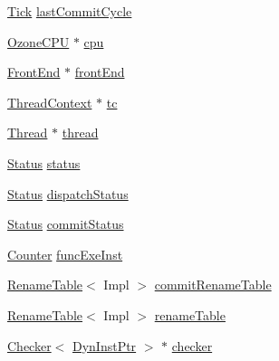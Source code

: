 \begin{DoxyCompactItemize}
\item 
\hyperlink{base_2types_8hh_a5c8ed81b7d238c9083e1037ba6d61643}{Tick} \hyperlink{classLWBackEnd_aeb527b92e111b469a5358de46cc799b6}{lastCommitCycle}
\item 
\hyperlink{classOzoneCPU}{OzoneCPU} $\ast$ \hyperlink{classLWBackEnd_a61b5f503eec141308b0cd6b4322b405b}{cpu}
\item 
\hyperlink{classFrontEnd}{FrontEnd} $\ast$ \hyperlink{classLWBackEnd_a67c762418bb2017cb2dce5a0c94f0788}{frontEnd}
\item 
\hyperlink{classThreadContext}{ThreadContext} $\ast$ \hyperlink{classLWBackEnd_a4455a4759e69e5ebe68ae7298cbcc37d}{tc}
\item 
\hyperlink{structOzoneThreadState}{Thread} $\ast$ \hyperlink{classLWBackEnd_a743989b66f3b52f1eda2a8498a93da0b}{thread}
\item 
\hyperlink{classLWBackEnd_a67a0db04d321a74b7e7fcfd3f1a3f70b}{Status} \hyperlink{classLWBackEnd_ae29aa2d4ae440022daaed1107eb306b3}{status}
\item 
\hyperlink{classLWBackEnd_a67a0db04d321a74b7e7fcfd3f1a3f70b}{Status} \hyperlink{classLWBackEnd_a245e3bace7ab490110304d56450aba64}{dispatchStatus}
\item 
\hyperlink{classLWBackEnd_a67a0db04d321a74b7e7fcfd3f1a3f70b}{Status} \hyperlink{classLWBackEnd_aed64bfbc119bb879e8625e3951e26502}{commitStatus}
\item 
\hyperlink{base_2types_8hh_ae1475755791765b8e6f6a8bb091e273e}{Counter} \hyperlink{classLWBackEnd_a344acde4f72898017365be79fd18a323}{funcExeInst}
\item 
\hyperlink{classRenameTable}{RenameTable}$<$ Impl $>$ \hyperlink{classLWBackEnd_adbf41f9b1f8e58747002bd5f65f2ded9}{commitRenameTable}
\item 
\hyperlink{classRenameTable}{RenameTable}$<$ Impl $>$ \hyperlink{classLWBackEnd_af8d3f859e7c0dd9408ba99de6f415616}{renameTable}
\item 
\hyperlink{classChecker}{Checker}$<$ \hyperlink{classLWBackEnd_a028ce10889c5f6450239d9e9a7347976}{DynInstPtr} $>$ $\ast$ \hyperlink{classLWBackEnd_af07b45c0b87d6672f4066d2c189013f9}{checker}
\end{DoxyCompactItemize}
